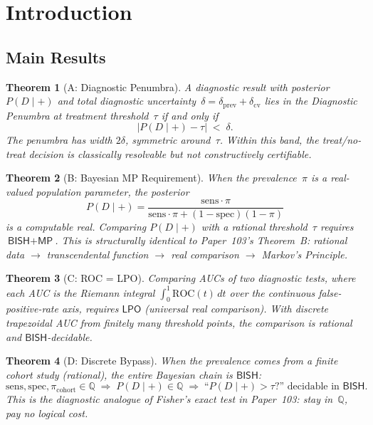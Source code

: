 \documentclass[11pt,a4paper]{article}
\theoremstyle{plain}
\newtheorem{theorem}{Theorem}[section]
\theoremstyle{definition}
\newcommand{\BISH}{\textsf{BISH}}
\newcommand{\LPO}{\textsf{LPO}}
\newcommand{\MP}{\textsf{MP}}
\newcommand{\Q}{\mathbb{Q}}
\begin{document}
\section{Introduction}\label{sec:intro}

\subsection{Main Results}

\begin{theorem}[A: Diagnostic Penumbra]\label{thm:A}
A diagnostic result with posterior $P(D \mid +)$ and total diagnostic uncertainty~$\delta = \delta_{\mathrm{prev}} + \delta_{\mathrm{cv}}$ lies in the \emph{Diagnostic Penumbra} at treatment threshold~$\tau$ if and only if
\[
  |P(D \mid +) - \tau| \;<\; \delta.
\]
The penumbra has width $2\delta$, symmetric around~$\tau$.  Within this band, the treat/no-treat decision is classically resolvable but not constructively certifiable.
\end{theorem}

\begin{theorem}[B: Bayesian MP Requirement]\label{thm:B}
When the prevalence~$\pi$ is a real-valued population parameter, the posterior
\[
  P(D \mid +) = \frac{\mathrm{sens} \cdot \pi}{\mathrm{sens} \cdot \pi + (1 - \mathrm{spec})(1 - \pi)}
\]
is a computable real.  Comparing $P(D \mid +)$ with a rational threshold~$\tau$ requires $\BISH + \MP$.  This is structurally identical to Paper~103's Theorem~B: rational data $\to$ transcendental function $\to$ real comparison $\to$ Markov's Principle.
\end{theorem}

\begin{theorem}[C: ROC = LPO]\label{thm:C}
Comparing AUCs of two diagnostic tests, where each AUC is the Riemann integral $\int_0^1 \mathrm{ROC}(t)\,dt$ over the continuous false-positive-rate axis, requires $\LPO$ (universal real comparison).  With discrete trapezoidal AUC from finitely many threshold points, the comparison is rational and $\BISH$-decidable.
\end{theorem}

\begin{theorem}[D: Discrete Bypass]\label{thm:D}
When the prevalence comes from a finite cohort study (rational), the entire Bayesian chain is $\BISH$:
\[
  \mathrm{sens}, \mathrm{spec}, \pi_{\mathrm{cohort}} \in \Q \;\Longrightarrow\; P(D \mid +) \in \Q \;\Longrightarrow\; \text{``$P(D \mid +) > \tau$?'' decidable in } \BISH.
\]
This is the diagnostic analogue of Fisher's exact test in Paper~103: stay in~$\Q$, pay no logical cost.
\end{theorem}
\end{document}
